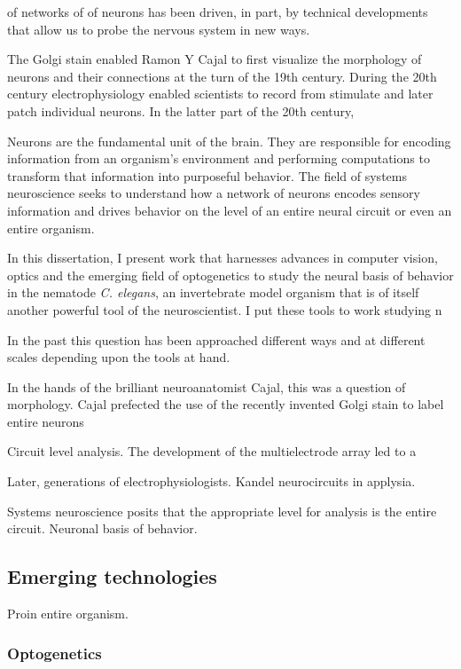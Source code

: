  of networks of of neurons has been driven, in part, by technical developments that allow us to probe the nervous system in new ways. 

The Golgi stain  enabled Ramon Y Cajal to first visualize the morphology of neurons and their connections at the turn of the 19th century. During the 20th century electrophysiology enabled scientists to record from stimulate and later patch individual neurons. In the latter part of the 20th century, 







Neurons are the fundamental unit of the brain.  They are responsible for encoding information from an organism's environment and performing computations to transform that information into purposeful behavior.  The field of systems neuroscience seeks to understand how a network of neurons encodes sensory information and drives behavior on the level of an entire neural circuit or even an entire organism.


In this dissertation, I present work that harnesses advances in computer vision, optics and the emerging field of optogenetics to study the neural basis of behavior in the nematode \emph{C. elegans}, an invertebrate model organism that is of itself another powerful tool of the neuroscientist. I put these tools to work studying n	 

 In the past this question has been approached different ways and at different scales depending upon the tools at hand. 


In the hands of the brilliant neuroanatomist Cajal, this was a question of morphology. Cajal prefected the use of the recently invented Golgi stain to label entire neurons 




Circuit level analysis.
The development of the multielectrode array \citep{meister_synchronous_1991} \citep{litke_retinal_1991}  led to a 

Later,  generations of electrophysiologists. 
Kandel neurocircuits in applysia.



Systems neuroscience posits that the appropriate level for analysis is the entire circuit. 
Neuronal basis of behavior. 



\subsection{Emerging technologies}
Proin entire organism. 

\subsubsection{Optogenetics}




